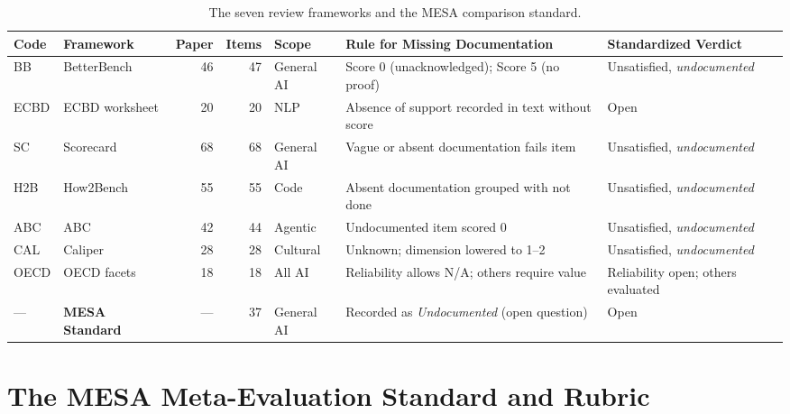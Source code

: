 \documentclass[runningheads]{llncs}
\begin{document}
\begin{table}[t]
\caption{The seven review frameworks and the MESA comparison standard.}
\label{tab:frameworks}
\centering
\scriptsize
\setlength{\tabcolsep}{3pt}
\begin{tabularx}{\textwidth}{@{}l>{\raggedright\arraybackslash}p{2.2cm}rr>{\raggedright\arraybackslash}p{2.4cm}>{\raggedright\arraybackslash}X>{\raggedright\arraybackslash}p{2.5cm}@{}}
\toprule
\textbf{Code} & \textbf{Framework} & \textbf{Paper} & \textbf{Items} & \textbf{Scope} & \textbf{Rule for Missing Documentation} & \textbf{Standardized Verdict} \\
\midrule
BB & BetterBench \cite{reuel_betterbench} & 46 & 47 & General AI & Score 0 (unacknowledged); Score 5 (no proof) & Unsatisfied, \emph{undocumented} \\
ECBD & ECBD worksheet \cite{liu_ecbd_2024} & 20 & 20 & NLP & Absence of support recorded in text without score & Open \\
SC & Scorecard \cite{san_joaquin_scorecard_2026} & 68 & 68 & General AI & Vague or absent documentation fails item & Unsatisfied, \emph{undocumented} \\
H2B & How2Bench \cite{cao_how2bench_2025} & 55 & 55 & Code & Absent documentation grouped with not done & Unsatisfied, \emph{undocumented} \\
ABC & ABC \cite{zhu_agentic_benchmark_checklist_2025} & 42 & 44 & Agentic & Undocumented item scored 0 & Unsatisfied, \emph{undocumented} \\
CAL & Caliper \cite{corona_benchmark_caliper_2026} & 28 & 28 & Cultural & Unknown; dimension lowered to 1--2 & Unsatisfied, \emph{undocumented} \\
OECD & OECD facets \cite{cohn_hernandez_orallo_oecd_2023} & 18 & 18 & All AI & Reliability allows N/A; others require value & Reliability open; others evaluated \\
\midrule
--- & \textbf{MESA Standard} & --- & 37 & General AI & Recorded as \emph{Undocumented} (open question) & Open \\
\bottomrule
\end{tabularx}
\end{table}

\section{The MESA Meta-Evaluation Standard and Rubric}
\label{sec:mesa_standard}
\end{document}

